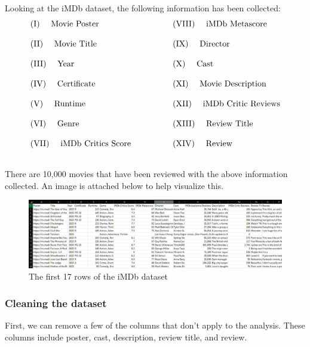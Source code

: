 \documentclass[12pt]{article}
\begin{document}
\noindent Looking at the iMDb dataset, the following information has been collected: \\
\[
\begin{array}{ll}
\text{(I) \quad Movie Poster} \qquad&\qquad \text{(VIII) \quad iMDb Metascore}  \\ \\
\text{(II) \quad Movie Title} \qquad&\qquad \text{(IX) \quad Director} \\ \\
\text{(III) \quad Year} \qquad&\qquad \text{(X) \quad Cast} \\ \\
\text{(IV) \quad Certificate} \qquad&\qquad \text{(XI) \quad Movie Description} \\ \\
\text{(V) \quad Runtime} \qquad&\qquad \text{(XII) \quad iMDb Critic Reviews} \\ \\
\text{(VI) \quad Genre} \qquad&\qquad \text{(XIII) \quad Review Title} \\ \\
\text{(VII) \quad iMDb Critics Score} \qquad&\qquad \text{(XIV) \quad Review} \\ \\

\end{array}
\]

\noindent There are 10,000 movies that have been reviewed with the above information collected. An image is attached below to help visualize this. \\

\begin{figure}[h]
\begin{center}
      \includegraphics[width=6in]{figure3.png}
      \caption{The first 17 rows of the iMDb dataset}
      \label{Figure 3}
\end{center}
\end{figure}

\newpage

\subsubsection{Cleaning the dataset}
First, we can remove a few of the columns that don't apply to the analysis. These columns include poster, cast, description, review title, and review. \\
\end{document}
